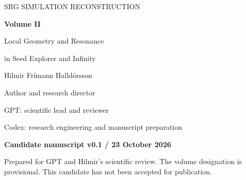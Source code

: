 \documentclass[11pt,a4paper]{article}
\begin{document}
\begin{titlepage}
\vspace*{12mm}
{\sffamily\large SRG SIMULATION RECONSTRUCTION\par}
\vspace{8mm}
{\huge\bfseries Volume II\par}
\vspace{5mm}
{\LARGE Local Geometry and Resonance\par}
\vspace{3mm}
{\LARGE in Seed Explorer and Infinity\par}
\vspace{12mm}
{\large Hilmir Frímann Halldórsson\par}
Author and research director\par
\vspace{4mm}
GPT: scientific lead and reviewer\par
Codex: research engineering and manuscript preparation\par
\vspace{10mm}
\textbf{Candidate manuscript v0.1 / 23 October 2026}\par
Prepared for GPT and Hilmir's scientific review. The volume designation is provisional. This candidate has not been accepted for publication.\par
\vfill
\begin{abstract}
What did the original moving-point SRG programs actually calculate, and which aspects of their reported organization survive a source-and-record reconstruction? This volume explains Seed Explorer (SIM04) and Infinity (SIM05) as distinct discrete algorithms. Both combine geometry-dependent local averaging, scheduled resonance changes, a global weighted-center displacement and positional randomness. Infinity additionally evolves a second real amplitude field with asymmetric local mixing strengths and symmetric cross-channel terms. Stored velocities are displacement diagnostics in both programs.

Seed Explorer's original 21 saved states show contraction, narrowing amplitudes and separation of the local graph; a minimal six-point component becomes compact while occupying the lowest amplitude ranks. Its normalized three-dimensional geometry changes as it shrinks. Infinity's accepted 200-pass replay develops five compact groups of 11, 13, 10, 10 and 6 distinct points, with nearly uniform amplitudes inside each group and different levels between groups. All 4,000 historical aggregate metrics agree within the retained tolerance, supporting attribution without replacing the missing historical trajectory. The endpoint echo and candidate masks acquire exact interpretations in the replay. Four reviewed mathematical statements explain neighborhood size, normalized averaging, the fusion centroid and conditional two-field uniformity. The account separates historical observations, reproduced states and derivations; it establishes neither an infinite-time limit nor a physical identification of the fields. No simulation or scientific numerical verification was rerun for this manuscript.
\end{abstract}
\end{titlepage}
\tableofcontents
\clearpage
\end{document}
